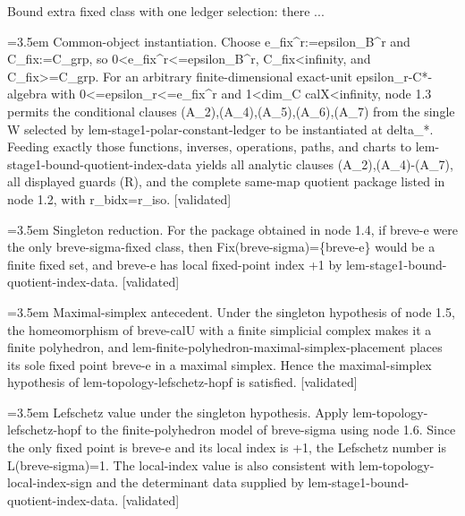 \documentclass{article}
\newcommand{\step}[1]{\par\noindent\hangindent=3.5em\hangafter=1%
  \makebox[3.5em][l]{\textbf{#1.}}}
\newcommand{\steptag}[1]{\hfill{\small\textsf{[#1]}}}
\begin{document}
\begin{proofbox}{Bound extra fixed class with one ledger selection: there ...}
\step{1.4} Common-object instantiation. Choose e\_fix\textasciicircum{}r:=epsilon\_B\textasciicircum{}r and C\_fix:=C\_grp, so 0<e\_fix\textasciicircum{}r<=epsilon\_B\textasciicircum{}r, C\_fix<infinity, and C\_fix>=C\_grp. For an arbitrary finite-dimensional exact-unit epsilon\_r-C*-algebra with 0<=epsilon\_r<=e\_fix\textasciicircum{}r and 1<dim\_C calX<infinity, node 1.3 permits the conditional clauses (A\_2),(A\_4),(A\_5),(A\_6),(A\_7) from the single W selected by lem-stage1-polar-constant-ledger to be instantiated at delta\_*. Feeding exactly those functions, inverses, operations, paths, and charts to lem-stage1-bound-quotient-index-data yields all analytic clauses (A\_2),(A\_4)-(A\_7), all displayed guards (R), and the complete same-map quotient package listed in node 1.2, with r\_bidx=r\_iso. \steptag{validated} \\[4pt]
\step{1.5} Singleton reduction. For the package obtained in node 1.4, if breve-e were the only breve-sigma-fixed class, then Fix(breve-sigma)=\{breve-e\} would be a finite fixed set, and breve-e has local fixed-point index +1 by lem-stage1-bound-quotient-index-data. \steptag{validated} \\[4pt]
\step{1.6} Maximal-simplex antecedent. Under the singleton hypothesis of node 1.5, the homeomorphism of breve-calU with a finite simplicial complex makes it a finite polyhedron, and lem-finite-polyhedron-maximal-simplex-placement places its sole fixed point breve-e in a maximal simplex. Hence the maximal-simplex hypothesis of lem-topology-lefschetz-hopf is satisfied. \steptag{validated} \\[4pt]
\step{1.7} Lefschetz value under the singleton hypothesis. Apply lem-topology-lefschetz-hopf to the finite-polyhedron model of breve-sigma using node 1.6. Since the only fixed point is breve-e and its local index is +1, the Lefschetz number is L(breve-sigma)=1. The local-index value is also consistent with lem-topology-local-index-sign and the determinant data supplied by lem-stage1-bound-quotient-index-data. \steptag{validated} \\[6pt]

\end{proofbox}
\end{document}
